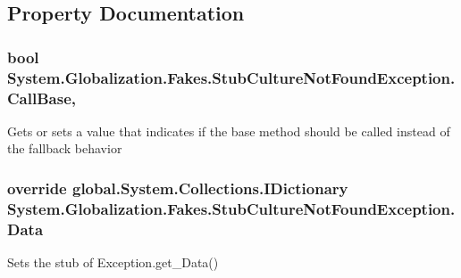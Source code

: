 \subsection{Property Documentation}
\hypertarget{class_system_1_1_globalization_1_1_fakes_1_1_stub_culture_not_found_exception_adba5ed3ba437951446f256cceb97d89c}{
\subsubsection[{Call\-Base}]{\setlength{\rightskip}{0pt plus 5cm}bool System.\-Globalization.\-Fakes.\-Stub\-Culture\-Not\-Found\-Exception.\-Call\-Base\hspace{0.3cm}{\ttfamily [get]}, {\ttfamily [set]}}}\label{class_system_1_1_globalization_1_1_fakes_1_1_stub_culture_not_found_exception_adba5ed3ba437951446f256cceb97d89c}


Gets or sets a value that indicates if the base method should be called instead of the fallback behavior

\hypertarget{class_system_1_1_globalization_1_1_fakes_1_1_stub_culture_not_found_exception_ab9f9c4334b60b32dab3d97977c792b50}{
\subsubsection[{Data}]{\setlength{\rightskip}{0pt plus 5cm}override global.\-System.\-Collections.\-I\-Dictionary System.\-Globalization.\-Fakes.\-Stub\-Culture\-Not\-Found\-Exception.\-Data\hspace{0.3cm}{\ttfamily [get]}}}\label{class_system_1_1_globalization_1_1_fakes_1_1_stub_culture_not_found_exception_ab9f9c4334b60b32dab3d97977c792b50}


Sets the stub of Exception.\-get\-\_\-\-Data()

